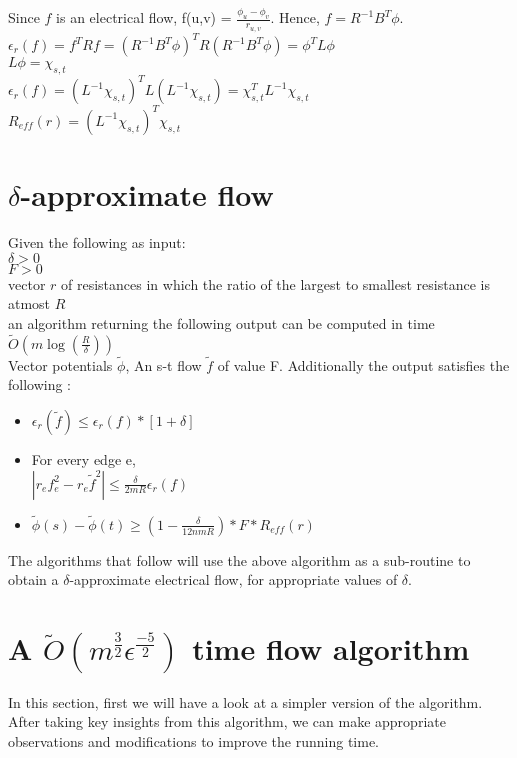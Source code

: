 \documentclass[a4paper,10pt]{article}
\newcommand{\eps}{\epsilon}
\begin{document}
	Since $f$ is an electrical flow, f(u,v) = $\frac{\phi_u - \phi_v}{r_{u,v}}$. Hence, $f = R^{-1}B^T \phi$.\\
	
	$\eps_r(f) = f^TRf = (R^{-1}B^T\phi)^T R (R^{-1} B^T \phi) = \phi^T L \phi$ \\
	
	$L \phi = \chi_{s,t}$ \\
	
	$\eps_r(f) = (L^{-1}\chi_{s,t})^T L (L^{-1} \chi_{s,t}) = \chi_{s,t}^T L^{-1} \chi_{s,t}$ \\
	
	$R_{eff}(r) = (L^{-1}\chi_{s,t})^T \chi_{s,t}$
	
      \section{$\delta$-approximate flow}
	Given the following as input: \\
	$\delta>0$ \\
	$F>0$ \\
	vector $r$ of resistances in which the ratio of the largest to smallest resistance is atmost $R$ \\
	
	an algorithm returning the following output can be computed in time $\widetilde{O}(m \log(\frac{R}{\delta}))$ \\
	
	Vector potentials $\widetilde{\phi}$, An s-t flow $\widetilde{f}$ of value F. Additionally the output satisfies the following : 
	\begin{itemize}
	 \item 
	  $\eps_r(\widetilde{f}) \leq \eps_r(f)\ast [1+\delta]$
	 \item
	  For every edge e, \\
	  
	  $|r_ef_e^2 - r_e\widetilde{f}^2| \leq \frac{\delta}{2mR}\eps_r(f)$
	 \item
	  $\widetilde{\phi}(s)-\widetilde{\phi}(t) \geq (1-\frac{\delta}{12nmR})\ast F \ast R_{eff}(r)$
	\end{itemize}

	The algorithms that follow will use the above algorithm as a sub-routine to obtain a $\delta$-approximate electrical flow, for appropriate
	values of $\delta$.
	
	\section{A $\widetilde{O}(m^{\frac{3}{2}}\eps^{\frac{-5}{2}})$ time flow algorithm}
	  In this section, first we will have a look at a simpler version of the algorithm. After taking key insights from this algorithm,
	  we can make appropriate observations and modifications to improve the running time. \\
	  
\end{document}

